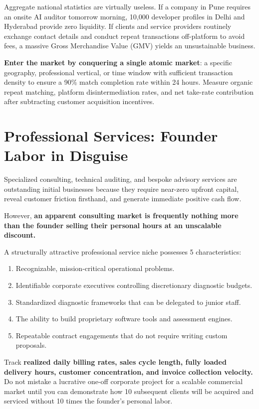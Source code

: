 Aggregate national statistics are virtually useless. If a company in Pune requires an onsite AI auditor tomorrow morning, 10,000 developer profiles in Delhi and Hyderabad provide zero liquidity. If clients and service providers routinely exchange contact details and conduct repeat transactions off-platform to avoid fees, a massive Gross Merchandise Value (GMV) yields an unsustainable business.

\textbf{Enter the market by conquering a single atomic market}: a specific geography, professional vertical, or time window with sufficient transaction density to ensure a 90\% match completion rate within 24 hours. Measure organic repeat matching, platform disintermediation rates, and net take-rate contribution after subtracting customer acquisition incentives.

\section{Professional Services: Founder Labor in Disguise}

Specialized consulting, technical auditing, and bespoke advisory services are outstanding initial businesses because they require near-zero upfront capital, reveal customer friction firsthand, and generate immediate positive cash flow.

However, \textbf{an apparent consulting market is frequently nothing more than the founder selling their personal hours at an unscalable discount.}

A structurally attractive professional service niche possesses 5 characteristics:
\begin{enumerate}[leftmargin=12pt,itemsep=1pt,topsep=1pt,parsep=0pt]
  \item Recognizable, mission-critical operational problems.
  \item Identifiable corporate executives controlling discretionary diagnostic budgets.
  \item Standardized diagnostic frameworks that can be delegated to junior staff.
  \item The ability to build proprietary software tools and assessment engines.
  \item Repeatable contract engagements that do not require writing custom proposals.
\end{enumerate}

Track \textbf{realized daily billing rates, sales cycle length, fully loaded delivery hours, customer concentration, and invoice collection velocity.} Do not mistake a lucrative one-off corporate project for a scalable commercial market until you can demonstrate how 10 subsequent clients will be acquired and serviced without 10 times the founder's personal labor.

